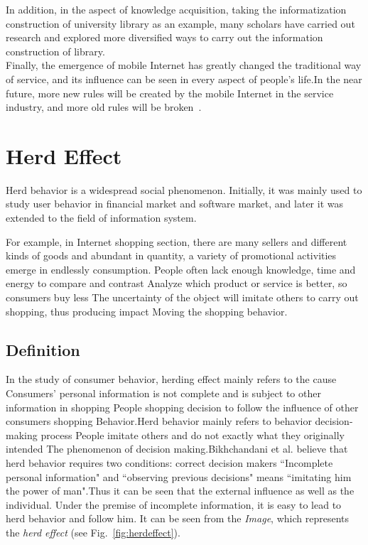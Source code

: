 \documentclass{elsarticle}
\begin{document}
In addition, in the aspect of knowledge acquisition, taking the informatization construction of university library as an example, many scholars have carried out research and explored more diversified ways to carry out the information construction of library\cite{tsg,chm}.\\

Finally, the emergence of mobile Internet has greatly changed the traditional way of service, and its influence can be seen in every aspect of people's life.In the near future, more new rules will be created by the mobile Internet in the service industry, and more old rules will be broken~\cite{zw10}.

\section{Herd Effect}\label{sec:herdeffect}
Herd behavior is a widespread social phenomenon. Initially, it was mainly used to study user behavior in financial market and software market, and later it was extended to the field of information system.

For example, in Internet shopping section, there are many sellers and different kinds of goods and abundant in quantity, a variety of promotional activities emerge in endlessly consumption. People often lack enough knowledge, time and energy to compare and contrast Analyze which product or service is better, so consumers buy less The uncertainty of the object will imitate others to carry out shopping, thus producing impact Moving the shopping behavior\cite{wgheyang}.

\subsection{Definition}\label{sec:defi}
In the study of consumer behavior, herding effect mainly refers to the cause
Consumers' personal information is not complete and is subject to other information in shopping
People shopping decision to follow the influence of other consumers shopping
Behavior.Herd behavior mainly refers to behavior decision-making process
People imitate others and do not exactly what they originally intended
The phenomenon of decision making.Bikhchandani et al. believe that herd behavior requires two conditions: correct decision makers ``Incomplete personal information" and ``observing previous decisions" means ``imitating him the power of man".Thus it can be seen that the external influence as well as the individual. Under the premise of incomplete information, it is easy to lead to herd behavior and follow him. It can be seen from the \emph{Image}, which represents the \emph{herd effect} (see Fig.~\ref{fig:herdeffect}).
\end{document}

